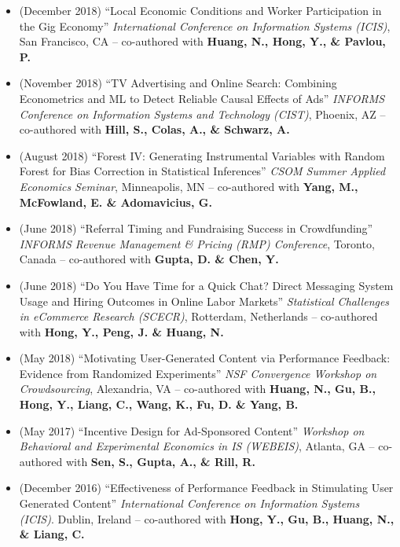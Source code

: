 \documentclass[10.5pt,letterpaper,sans]{moderncv}        %
\begin{document}
\begin{itemize}
\item (December 2018) ``Local Economic Conditions and Worker Participation in the Gig Economy'' \textit{International Conference on Information Systems (ICIS)}, San Francisco, CA -- co-authored with \textbf{Huang, N., Hong, Y., \& Pavlou, P.} 

\item (November 2018) ``TV Advertising and Online Search: Combining Econometrics and ML to Detect Reliable Causal Effects of Ads'' \textit{INFORMS Conference on Information Systems and Technology (CIST)}, Phoenix, AZ -- co-authored with \textbf{Hill, S., Colas, A., \& Schwarz, A.}

\item (August 2018) ``Forest IV: Generating Instrumental Variables with Random Forest for Bias Correction in Statistical Inferences'' \textit{CSOM Summer Applied Economics Seminar}, Minneapolis, MN -- co-authored with \textbf{Yang, M., McFowland, E. \& Adomavicius, G.}

\item (June 2018) ``Referral Timing and Fundraising Success in Crowdfunding'' \textit{INFORMS Revenue Management \& Pricing (RMP) Conference}, Toronto, Canada -- co-authored with \textbf{Gupta, D. \& Chen, Y.}

\item (June 2018) ``Do You Have Time for a Quick Chat? Direct Messaging System Usage and Hiring Outcomes in Online Labor Markets'' \textit{Statistical Challenges in eCommerce Research (SCECR)}, Rotterdam, Netherlands -- co-authored with \textbf{Hong, Y., Peng, J. \& Huang, N.}

\item (May 2018) ``Motivating User-Generated Content via Performance Feedback: Evidence from Randomized Experiments'' \textit{NSF Convergence Workshop on Crowdsourcing}, Alexandria, VA -- co-authored with \textbf{Huang, N., Gu, B., Hong, Y., Liang, C., Wang, K., Fu, D. \& Yang, B.}

\item (May 2017) ``Incentive Design for Ad-Sponsored Content'' \textit{Workshop on Behavioral and Experimental Economics in IS (WEBEIS)}, Atlanta, GA -- co-authored with \textbf{Sen, S., Gupta, A., \& Rill, R.}

\item (December 2016) ``Effectiveness of Performance Feedback in Stimulating User Generated Content'' \textit{International Conference on Information Systems (ICIS)}. Dublin, Ireland -- co-authored with \textbf{Hong, Y., Gu, B., Huang, N., \& Liang, C.}


\end{itemize}
\end{document}
